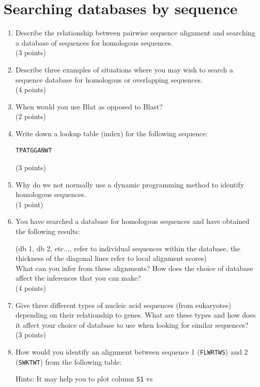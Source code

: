 \documentclass[11pt]{article}
\begin{document}
\section{Searching databases by sequence}
\begin{enumerate}
\item Describe the relationship between pairwise sequence alignment and
  searching a database of sequences for homologous sequences.\\
  (3 points)
\item Describe three examples of situations where you may wish to search a
  sequence database for homologous or overlapping sequences.\\
  (4 points)
\item When would you use Blat as opposed to Blast?\\
  (2 points)
\item Write down a lookup table (index) for the following sequence:
\begin{verbatim}
TPATGGANWT
\end{verbatim}
 (3 points)
\item Why do we not normally use a dynamic programming method to identify
  homologous sequences.\\
  (1 point)
\item You have searched a database for homologous sequences and have obtained
  the following results:
\begin{figure}[H]
  
\end{figure}
{\small(db 1, db 2, etc..., refer to individual sequences within the database, the
thickness of the diagonal lines refer to local alignment scores)}\\
What can you infer from these alignments? How does the choice of database
affect the inferences that you can make?\\
(4 points)
\item Give three different types of nucleic acid sequences (from eukaryotes)
  depending on their relationship to genes. What are these types and how does
  it affect your choice of database to use when looking for similar sequences?\\
(3 points)
\item How would you identify an alignment between sequence 1 (\verb|FLWRTWS|) 
  and 2 (\verb|SWKTWT|) from the following table:
\begin{figure}[H]
  
\end{figure}
{\small Hints: It may help you to plot column \texttt{S1} vs
}
\end{enumerate}
\end{document}
